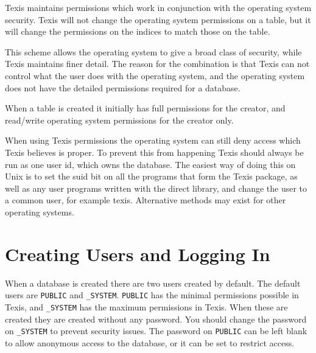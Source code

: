 Texis maintains permissions which work in conjunction with the
operating system security.  Texis will not change the operating
system permissions on a table, but it will change the permissions
on the indices to match those on the table.

This scheme allows
the operating system to give a broad class of security, while
Texis maintains finer detail.  The reason for the combination
is that Texis can not control what the user does with the
operating system, and the operating system does not have the
detailed permissions required for a database.

When a table is created it initially has full permissions for the
creator, and read/write operating system permissions for the creator
only.



When using Texis permissions the operating system can still deny
access which Texis believes is proper.  To prevent this from
happening Texis should always be run as one user id, which owns
the database.  The easiest way of doing this on Unix is to set
the suid bit on all the programs that form the Texis package,
as well as any user programs written with the direct library,
and change the user to a common user, for example texis.
Alternative methods may exist for other operating systems.

\section{Creating Users and Logging In}

When a database is created there are two users created by default.
The default users are {\tt PUBLIC} and {\tt \_SYSTEM}.  {\tt PUBLIC}
has the minimal permissions possible in Texis, and {\tt \_SYSTEM} has
the maximum permissions in Texis.  When these are created they are
created without any password.  You should change the password on
{\tt \_SYSTEM} to prevent security issues.  The password on {\tt PUBLIC}
can be left blank to allow anonymous access to the database, or it can
be set to restrict access.


